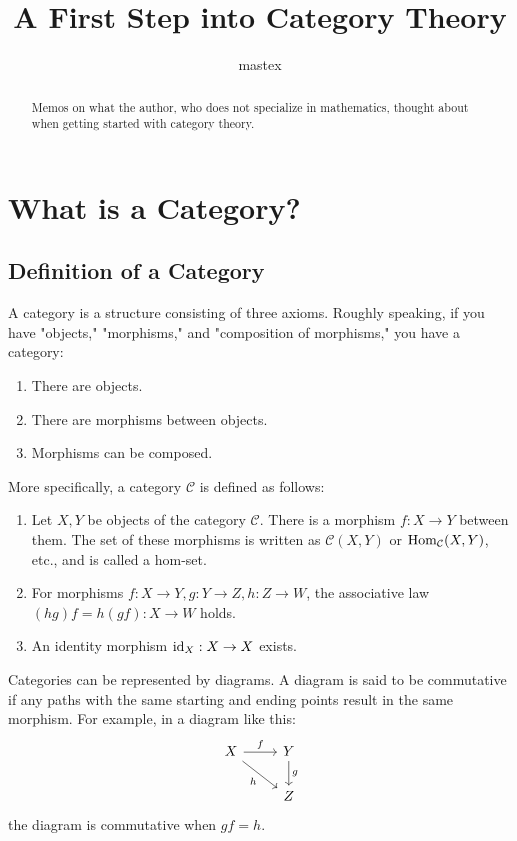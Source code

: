 \documentclass[uplatex,a4j,12pt,dvipdfmx]{jsarticle}
\title{
A First Step into Category Theory
}
\author{
mastex
}
\begin{document}
\maketitle

\begin{abstract}
Memos on what the author, who does not specialize in mathematics, thought about when getting started with category theory.
\end{abstract}

\section{What is a Category?}

\subsection{Definition of a Category}

A category is a structure consisting of three axioms. Roughly speaking, if you have "objects," "morphisms," and "composition of morphisms," you have a category:

\begin{enumerate}
    \item There are objects.
    \item There are morphisms between objects.
    \item Morphisms can be composed.
\end{enumerate}

More specifically, a category ${\mathcal C}$ is defined as follows:

\begin{enumerate}
    \item Let $X,Y$ be objects of the category ${\mathcal C}$. There is a morphism $f: X \to Y$ between them.
    The set of these morphisms is written as ${\mathcal C}(X,Y)$ or ${\rm Hom}_{\mathcal C}(X,Y)$, etc., and is called a hom-set.
    \item For morphisms $f: X \to Y, g: Y \to Z, h: Z \to W$, the associative law $(hg)f = h(gf): X \to W$ holds.
    \item An identity morphism ${\rm id}_{X}: X \to X$ exists.
\end{enumerate}

Categories can be represented by diagrams.
A diagram is said to be commutative if any paths with the same starting and ending points result in the same morphism.
For example, in a diagram like this:
\[
\begin{tikzcd}
X \arrow[r,"f"]\arrow[rd,"h"'] & Y \arrow[d,"g"]\\
& Z
\end{tikzcd}
\]
the diagram is commutative when $gf=h$.
\end{document}
